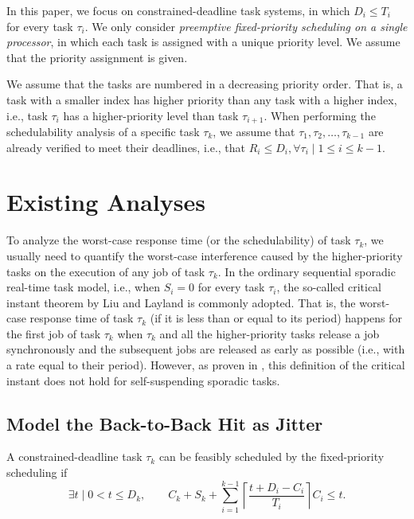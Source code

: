 \documentclass[10pt,conference]{IEEEtran}
\newcommand{\ceiling}[1]{\left\lceil{#1}\right\rceil}
\begin{document}
In this paper, we focus on constrained-deadline task systems, in which $D_i \leq T_i$ for every task $\tau_i$. We only consider \emph{preemptive fixed-priority scheduling on a single processor}, in which each task is assigned with a unique priority level. We assume that the priority assignment is given.

We assume that the tasks are numbered in a decreasing priority order. That is, a task with a smaller index has higher priority than any task with a higher index, i.e., task $\tau_i$ has a higher-priority level than task $\tau_{i+1}$. When performing the schedulability analysis of a specific task $\tau_k$, we assume that $\tau_1, \tau_2, \ldots, \tau_{k-1}$ are already verified to meet their deadlines, i.e., that $R_i \leq D_i, \forall \tau_i \mid 1 \leq i \leq k-1$. 

\section{Existing Analyses}

To analyze the worst-case response time (or the schedulability) of task $\tau_k$, we usually need to quantify the worst-case interference caused by the higher-priority tasks on the execution of any job of task $\tau_k$. In the ordinary sequential sporadic real-time task model, i.e., when $S_i=0$ for every task $\tau_i$, the so-called critical instant theorem by Liu and Layland \cite{Liu_1973} is commonly adopted. That is, the worst-case response time of task $\tau_k$ (if it is less than or equal to its period) happens for the first job of task $\tau_k$ when $\tau_k$ and all the higher-priority tasks release a job synchronously and the subsequent jobs are released as early as possible (i.e., with a rate equal to their period).  However, as proven in \cite{ecrts15nelissen}, this definition of the
critical instant does not hold for self-suspending sporadic tasks.  

\subsection{Model the Back-to-Back Hit as Jitter}
\label{sec:jitter}


A constrained-deadline task $\tau_k$ can be feasibly scheduled by the fixed-priority scheduling if
\begin{equation}
\label{eq:TDA-jitter}
\exists t \mid 0 < t \leq D_k, \qquad C_k + S_k + \sum_{i=1}^{k-1}\ceiling{\frac{t+D_i-C_i}{T_i}} C_i \leq t.
\end{equation}
\end{document}
